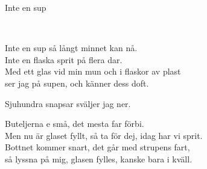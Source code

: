 \begin{song}{Inte en sup}
	
	
	\\
	
	Inte en sup så långt minnet kan nå.\\
	Inte en flaska sprit på flera dar.\\
	Med ett glas vid min mun och i flaskor av plast\\
	ser jag på supen, och känner dess doft.
	
	Sjuhundra snapsar sväljer jag ner.
	
	Buteljerna e små, det mesta far förbi.\\
	Men nu är glaset fyllt, så ta för dej, idag har vi sprit.\\
	Bottnet kommer snart, det går med strupens fart,\\
	så lyssna på mig, glasen fylles, kanske bara i kväll.
	
\end{song}
